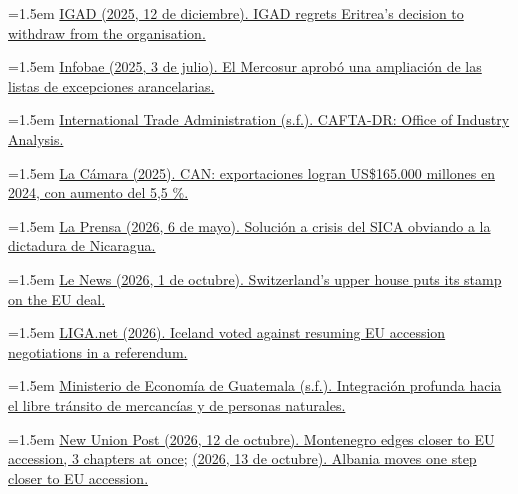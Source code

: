 \documentclass[10pt,a4paper]{article}
\begin{document}
\noindent\hangindent=1.5em \href{https://igad.int/igad-regrets-eritreas-decision-to-withdraw-from-the-organisation/}{IGAD (2025, 12 de diciembre). IGAD regrets Eritrea's decision to withdraw from the organisation.}

\noindent\hangindent=1.5em \href{https://www.infobae.com/america/america-latina/2025/07/03/el-mercosur-aprobo-una-ampliacion-de-las-listas-de-excepciones-arancelarias/}{Infobae (2025, 3 de julio). El Mercosur aprobó una ampliación de las listas de excepciones arancelarias.}

\noindent\hangindent=1.5em \href{https://legacy.trade.gov/mas/ian/tradeagreements/fta/tg_ian_002419.asp}{International Trade Administration (s.f.). CAFTA-DR: Office of Industry Analysis.}

\noindent\hangindent=1.5em \href{https://lacamara.pe/can-exportaciones-logran-us-165-000-millones-en-2024-con-aumento-del-5-5/}{La Cámara (2025). CAN: exportaciones logran US\$165.000 millones en 2024, con aumento del 5,5 \%.}

\noindent\hangindent=1.5em \href{https://www.laprensani.com/2026/05/06/editorial/3689991-solucion-a-crisis-del-sica-obviando-a-la-dictadura-de-nicaragua}{La Prensa (2026, 6 de mayo). Solución a crisis del SICA obviando a la dictadura de Nicaragua.}

\noindent\hangindent=1.5em \href{https://lenews.ch/2026/10/01/switzerlands-upper-house-puts-its-stamp-on-the-eu-deal/}{Le News (2026, 1 de octubre). Switzerland's upper house puts its stamp on the EU deal.}

\noindent\hangindent=1.5em \href{https://news.liga.net/en/world/news/iceland-voted-against-resuming-eu-accession-negotiations-in-a-referendum}{LIGA.net (2026). Iceland voted against resuming EU accession negotiations in a referendum.}

\noindent\hangindent=1.5em \href{https://www.mineco.gob.gt/images/que_hacer/integracion/nuevo/INFO_INTEGRACION_PROFUNDA.pdf}{Ministerio de Economía de Guatemala (s.f.). Integración profunda hacia el libre tránsito de mercancías y de personas naturales.}

\noindent\hangindent=1.5em \href{https://newunionpost.eu/2026/10/12/montenegro-eu-accession-negotiations-2/}{New Union Post (2026, 12 de octubre). Montenegro edges closer to EU accession, 3 chapters at once}; \href{https://newunionpost.eu/2026/10/13/albania-eu-accession-close-chapter-20/}{(2026, 13 de octubre). Albania moves one step closer to EU accession.}
\end{document}
